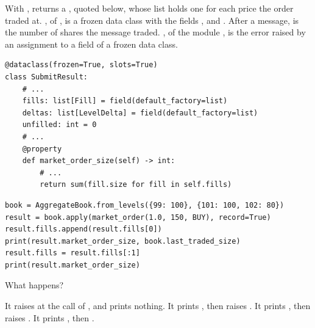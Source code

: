 \begin{question}
\label{question.frozenSubmitResultHoldsAList}
With ,  returns a , quoted below,
whose list  holds one  for each price the order traded at.
, of , is a frozen data class
with the fields ,  and .
After a message,  is the number of shares the message traded.
, of the module ,
is the error raised by an assignment to a field of a frozen data class.
\begin{lstlisting}[caption={\protect\codehl{unito26.lob.orderbook.SubmitResult}, abridged: its docstrings and one property are cut.}, label=listing.frozenSubmitResultHoldsAListQuote]
@dataclass(frozen=True, slots=True)
class SubmitResult:
    # ...
    fills: list[Fill] = field(default_factory=list)
    deltas: list[LevelDelta] = field(default_factory=list)
    unfilled: int = 0
    # ...
    @property
    def market_order_size(self) -> int:
        # ...
        return sum(fill.size for fill in self.fills)
\end{lstlisting}
\begin{lstlisting}[caption={A fill appended, and the fills rebound}, label=listing.frozenSubmitResultHoldsAListRun]
book = AggregateBook.from_levels({99: 100}, {101: 100, 102: 80})
result = book.apply(market_order(1.0, 150, BUY), record=True)
result.fills.append(result.fills[0])
print(result.market_order_size, book.last_traded_size)
result.fills = result.fills[:1]
print(result.market_order_size)
\end{lstlisting}
What happens?
\begin{choices}
 \choice It raises  at the call of , and prints nothing.
 \choice It prints , then raises .
 \correctchoice It prints , then raises .
 \choice It prints , then .
\end{choices}
\end{question}

